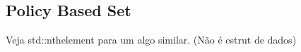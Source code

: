 \subsection{Policy Based Set}

Veja std::nthelement para um algo similar. (Não é estrut de dados)


